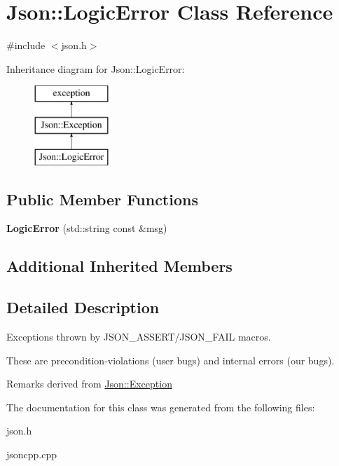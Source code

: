 \hypertarget{class_json_1_1_logic_error}{\section{Json\-:\-:Logic\-Error Class Reference}
\label{class_json_1_1_logic_error}
}


{\ttfamily \#include $<$json.\-h$>$}

Inheritance diagram for Json\-:\-:Logic\-Error\-:\begin{figure}[H]
\begin{center}
\leavevmode
\includegraphics[height=3.000000cm]{class_json_1_1_logic_error}
\end{center}
\end{figure}
\subsection*{Public Member Functions}
\begin{DoxyCompactItemize}
\item 
\hypertarget{class_json_1_1_logic_error_ae8a834c790017a55df74c70b91f23329}{{\bfseries Logic\-Error} (std\-::string const \&msg)}\label{class_json_1_1_logic_error_ae8a834c790017a55df74c70b91f23329}

\end{DoxyCompactItemize}
\subsection*{Additional Inherited Members}


\subsection{Detailed Description}
Exceptions thrown by J\-S\-O\-N\-\_\-\-A\-S\-S\-E\-R\-T/\-J\-S\-O\-N\-\_\-\-F\-A\-I\-L macros.

These are precondition-\/violations (user bugs) and internal errors (our bugs).

\begin{DoxyRemark}{Remarks}
derived from \hyperlink{class_json_1_1_exception}{Json\-::\-Exception} 
\end{DoxyRemark}


The documentation for this class was generated from the following files\-:\begin{DoxyCompactItemize}
\item 
json.\-h\item 
jsoncpp.\-cpp\end{DoxyCompactItemize}
